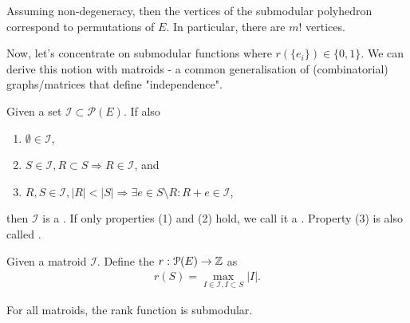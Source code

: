 \begin{note}
    Assuming non-degeneracy, then the vertices of the submodular polyhedron
    correspond to permutations of $E$. In particular, there are $m!$ vertices.
\end{note}
Now, let's concentrate on submodular functions where $r(\{e_i\}) \in \{0,1\}$.
We can derive this notion with matroids - a common generalisation of (combinatorial) graphs/matrices that
define "independence".
\begin{definition}[Matroid]
    Given a set $\mathcal{I} \subset \mathcal{P}(E)$. If also
    \begin{enumerate}
        \item $\emptyset \in \mathcal{I}$,
        \item $S \in \mathcal{I}, R \subset S \Rightarrow R \in \mathcal{I}$, and
        \item $R,S \in \mathcal{I}, |R|< |S| \Rightarrow \exists e \in S\setminus R: R+e\in \mathcal{I}$,
    \end{enumerate}
    then $\mathcal{I}$ is a . If only properties (1) and (2) hold, we call it a .
    Property (3) is also called .
\end{definition}
\begin{definition}
    Given a matroid $\mathcal I$. Define the  $r : \mathcal P(E) \rightarrow \integers$ as
    \begin{align*}
        r(S) = \max_{I \in \mathcal{I}, I \subset S} |I|.
    \end{align*}
\end{definition}
\begin{theorem}
    For all matroids, the rank function is submodular.
\end{theorem}
